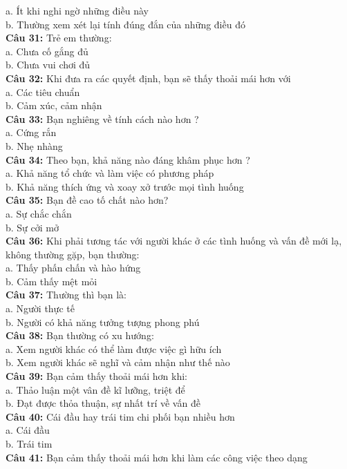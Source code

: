 \begin{multicols}{2}
a. Ít khi nghi ngờ những điều này \\
b. Thường xem xét lại tính đúng đắn của những điều đó \\
\textbf{Câu 31:} Trẻ em thường: \\
a. Chưa cố gắng đủ \\
b. Chưa vui chơi đủ \\
\textbf{Câu 32:} Khi đưa ra các quyết định, bạn sẽ thấy thoải mái hơn với \\
a. Các tiêu chuẩn \\
b. Cảm xúc, cảm nhận \\
\textbf{Câu 33:} Bạn nghiêng về tính cách nào hơn ? \\
a. Cứng rắn \\
b. Nhẹ nhàng \\
\textbf{Câu 34:} Theo bạn, khả năng nào đáng khâm phục hơn ? \\
a. Khả năng tổ chức và làm việc có phương pháp \\
b. Khả năng thích ứng và xoay xở trước mọi tình huống \\
\textbf{Câu 35:} Bạn đề cao tố chất nào hơn? \\
a. Sự chắc chắn \\
b. Sự cởi mở \\
\textbf{Câu 36:} Khi phải tương tác với người khác ở các tình huống và vấn đề mới lạ, không thường gặp, bạn thường: \\
a. Thấy phấn chấn và hào hứng \\
b. Cảm thấy mệt mỏi \\
\textbf{Câu 37:} Thường thì bạn là: \\
a. Người thực tế \\
b. Người có khả năng tưởng tượng phong phú \\
\textbf{Câu 38:} Bạn thường có xu hướng: \\
a. Xem người khác có thể làm được việc gì hữu ích \\
b. Xem người khác sẽ nghĩ và cảm nhận như thế nào \\
\textbf{Câu 39:} Bạn cảm thấy thoải mái hơn khi: \\
a. Thảo luận một vân đề kĩ lưỡng, triệt để \\
b. Đạt được thỏa thuận, sự nhất trí về vấn đề \\
\textbf{Câu 40:} Cái đầu hay trái tim chi phối bạn nhiều hơn \\
a. Cái đầu \\
b. Trái tim \\
\textbf{Câu 41:} Bạn cảm thấy thoải mái hơn khi làm các công việc theo dạng \\

\end{multicols}
